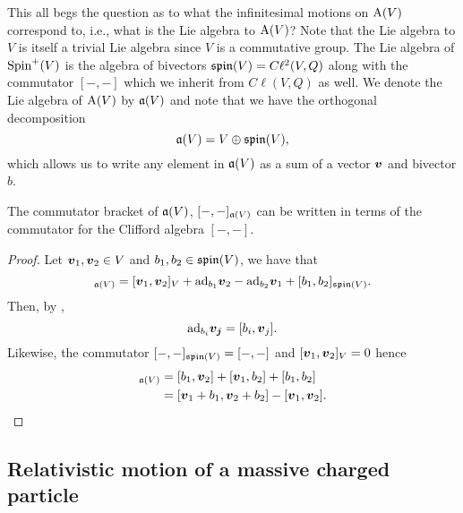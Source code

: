 \documentclass[conf]{new-aiaa}
\begin{document}
This all begs the question as to what the infinitesimal motions on $\operatorname{A}(V)$ correspond to, i.e., what is the Lie algebra to $\operatorname{A}(V)$? Note that the Lie algebra to $V$ is itself a trivial Lie algebra since $V$ is a commutative group. The Lie algebra of $\operatorname{Spin}^+(V)$ is the algebra of bivectors $\mathfrak{spin}(V)=C\ell^2(V,Q)$ along with the commutator $[-,-]$ which we inherit from $C\ell(V,Q)$ as well. We denote the Lie algebra of $\operatorname{A}(V)$ by $\mathfrak{a}(V)$ and note that we have the orthogonal decomposition
\begin{equation}
\mathfrak{a}(V)=V\oplus \mathfrak{spin}(V),
\end{equation}
which allows us to write any element in $\mathfrak{a}(V)$ as a sum of a vector $\boldsymbol{v}$ and bivector $b$. 

\begin{proposition}
The commutator bracket of $\mathfrak{a}(V)$, $[-,-]_{\mathfrak{a}(V)}$ can be written in terms of the commutator for the Clifford algebra $[-,-]$.
\end{proposition}
\begin{proof}
Let $\boldsymbol{v}_1,\boldsymbol{v}_2\in V$ and $b_1,b_2 \in \mathfrak{spin}(V)$, we have that 
\begin{equation}
[\blade{v}_1+b_1,\blade{v}_2+b_2]_{\liealg(V)} = [\blade{v}_1,\blade{v}_2]_{V}+\mathrm{ad}_{b_1}\blade{v}_2 - \mathrm{ad}_{b_2}\blade{v}_1 + [b_1,b_2]_{\spina(V)}.
\end{equation}
Then, by \cite[Lemma 5.7]{gracia-bondia_elements_2001}, 
\begin{equation}
\mathrm{ad}_{b_i}\boldsymbol{v_j}=[b_i,\boldsymbol{v}_j].
\end{equation}
Likewise, the commutator $[-,-]_{\mathfrak{spin}(V)}=[-,-]$ and $[\boldsymbol{v}_1,\boldsymbol{v}_2]_V=0$ hence
\begin{align}
[\blade{v}_1 + b_1,\blade{v}_2+b_2]_{\liealg(V)} &= [b_1,\blade{v}_2] + [\blade{v}_1,b_2] + [b_1,b_2]\\
&= [\blade{v}_1+b_1,\blade{v}_2+b_2]-[\blade{v}_1,\blade{v}_2].
\end{align}
\end{proof}

\subsection{Relativistic motion of a massive charged particle}
\end{document}
